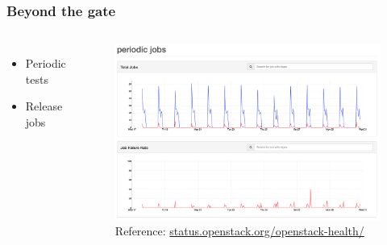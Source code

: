 \documentclass[aspectratio=169,11pt,hyperref={colorlinks=true}]{beamer}
\begin{document}

\begin{frame}
    \frametitle{Beyond the gate}
    \begin{columns}
            \begin{itemize}
                \item{Periodic tests}
                \item{Release jobs}
            \end{itemize}
            \begin{figure}
                \includegraphics[width=1\textwidth]{periodic_jobs.png}
                \caption{Reference: \href{http://status.openstack.org/openstack-health/\#/g/build_queue/periodic}{status.openstack.org/openstack-health/}}
            \end{figure}
    \end{columns}
\end{frame}

\end{document}
